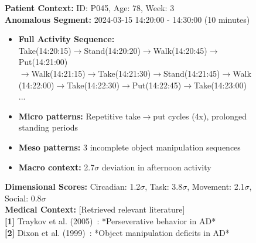 \documentclass[sigconf, anonymous, 9pt, nonacm]{acmart}
\begin{document}
\begin{figure}[t]
\vspace{-1em}
\centering
\begin{tcolorbox}[title=Example of LLM Input Structure, fontupper=\small]
\textbf{Patient Context:} ID: P045, Age: 78, Week: 3 \\
\textbf{Anomalous Segment:} 2024-03-15 14:20:00 - 14:30:00 (10 minutes)
\begin{itemize}[leftmargin=15pt,itemsep=0pt]
\item \textbf{Full Activity Sequence:} \\
Take(14:20:15)$\rightarrow$Stand(14:20:20)$\rightarrow$Walk(14:20:45)$\rightarrow$Put(14:21:00)\\$\rightarrow$Walk(14:21:15)$\rightarrow$Take(14:21:30)$\rightarrow$Stand(14:21:45)$\rightarrow$Walk\\(14:22:00)$\rightarrow$Take(14:22:30)$\rightarrow$Put(14:22:45)$\rightarrow$Take(14:23:00) ...
\item \textbf{Micro patterns:} Repetitive take$\rightarrow$put cycles (4x), prolonged standing periods
\item \textbf{Meso patterns:} 3 incomplete object manipulation sequences
\item \textbf{Macro context:} 2.7$\sigma$ deviation in afternoon activity
\end{itemize}
\textbf{Dimensional Scores:} Circadian: 1.2$\sigma$, Task: 3.8$\sigma$, Movement: 2.1$\sigma$, Social: 0.8$\sigma$ \\
\textbf{Medical Context:} [Retrieved relevant literature] \\
\textbf{[1]} Traykov et al. (2005)~\cite{Traykov2005}: *Perseverative behavior in AD* \\
\textbf{[2]} Dixon et al. (1999)~\cite{Dixon1999}: *Object manipulation deficits in AD*
\end{tcolorbox}
\vspace{-3em}
\end{figure}
\end{document}
